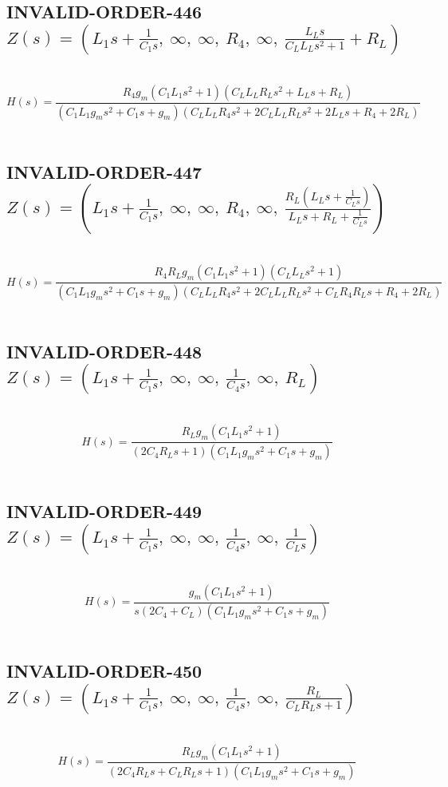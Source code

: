\documentclass{article}
\begin{document}
\subsection{INVALID-ORDER-446 $Z(s) = \left( L_{1} s + \frac{1}{C_{1} s}, \  \infty, \  \infty, \  R_{4}, \  \infty, \  \frac{L_{L} s}{C_{L} L_{L} s^{2} + 1} + R_{L}\right)$ } \ 
\textbf{\[H(s) = \frac{R_{4} g_{m} \left(C_{1} L_{1} s^{2} + 1\right) \left(C_{L} L_{L} R_{L} s^{2} + L_{L} s + R_{L}\right)}{\left(C_{1} L_{1} g_{m} s^{2} + C_{1} s + g_{m}\right) \left(C_{L} L_{L} R_{4} s^{2} + 2 C_{L} L_{L} R_{L} s^{2} + 2 L_{L} s + R_{4} + 2 R_{L}\right)}\] } \ 
\subsection{INVALID-ORDER-447 $Z(s) = \left( L_{1} s + \frac{1}{C_{1} s}, \  \infty, \  \infty, \  R_{4}, \  \infty, \  \frac{R_{L} \left(L_{L} s + \frac{1}{C_{L} s}\right)}{L_{L} s + R_{L} + \frac{1}{C_{L} s}}\right)$ } \ 
\textbf{\[H(s) = \frac{R_{4} R_{L} g_{m} \left(C_{1} L_{1} s^{2} + 1\right) \left(C_{L} L_{L} s^{2} + 1\right)}{\left(C_{1} L_{1} g_{m} s^{2} + C_{1} s + g_{m}\right) \left(C_{L} L_{L} R_{4} s^{2} + 2 C_{L} L_{L} R_{L} s^{2} + C_{L} R_{4} R_{L} s + R_{4} + 2 R_{L}\right)}\] } \ 
\subsection{INVALID-ORDER-448 $Z(s) = \left( L_{1} s + \frac{1}{C_{1} s}, \  \infty, \  \infty, \  \frac{1}{C_{4} s}, \  \infty, \  R_{L}\right)$ } \ 
\textbf{\[H(s) = \frac{R_{L} g_{m} \left(C_{1} L_{1} s^{2} + 1\right)}{\left(2 C_{4} R_{L} s + 1\right) \left(C_{1} L_{1} g_{m} s^{2} + C_{1} s + g_{m}\right)}\] } \ 
\subsection{INVALID-ORDER-449 $Z(s) = \left( L_{1} s + \frac{1}{C_{1} s}, \  \infty, \  \infty, \  \frac{1}{C_{4} s}, \  \infty, \  \frac{1}{C_{L} s}\right)$ } \ 
\textbf{\[H(s) = \frac{g_{m} \left(C_{1} L_{1} s^{2} + 1\right)}{s \left(2 C_{4} + C_{L}\right) \left(C_{1} L_{1} g_{m} s^{2} + C_{1} s + g_{m}\right)}\] } \ 
\subsection{INVALID-ORDER-450 $Z(s) = \left( L_{1} s + \frac{1}{C_{1} s}, \  \infty, \  \infty, \  \frac{1}{C_{4} s}, \  \infty, \  \frac{R_{L}}{C_{L} R_{L} s + 1}\right)$ } \ 
\textbf{\[H(s) = \frac{R_{L} g_{m} \left(C_{1} L_{1} s^{2} + 1\right)}{\left(2 C_{4} R_{L} s + C_{L} R_{L} s + 1\right) \left(C_{1} L_{1} g_{m} s^{2} + C_{1} s + g_{m}\right)}\] } \ 
\end{document}
